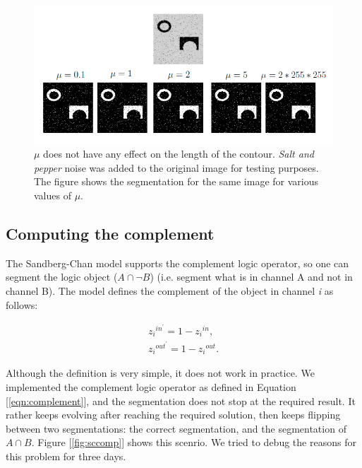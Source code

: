 \documentclass[10pt,twocolumn,letterpaper]{article}
\begin{document}
\begin{figure}[t]
\centering
\includegraphics[width=\textwidth]{cvmu.png}
\caption{$\mu$ does not have any effect on the length of the contour. \textit{Salt and pepper} noise was added to the original image for testing purposes. The
figure shows the segmentation for the same image for various values of $\mu$.}
\label{fig:cvmu}
\end{figure}

\subsection{Computing the complement}
The Sandberg-Chan model supports the complement logic operator, so one can segment the logic object ($A \cap \neg B$) (i.e. segment what is in channel A and not
in channel B). The model defines the complement of the object in channel \textit{i} as follows:

\begin{equation}
\label{eqn:complement}
\begin{align*}
{z_{i}}^{in^{'}} = 1 - {z_{i}}^{in}, \\
{z_{i}}^{out^{'}} = 1 - {z_{i}}^{out}.
\end{align*}
\end{equation}

Although the definition is very simple, it does not work in practice. We implemented the complement logic operator as defined in Equation
[\ref{eqn:complement}], and the segmentation does not stop at the required result. It rather keeps evolving after reaching the required solution, then keeps
flipping between two segmentations: the correct segmentation, and the segmentation of $A \cap B$. Figure [\ref{fig:sccomp}] shows this scenrio. We tried to
debug the reasons for this problem for three days.
\end{document}
